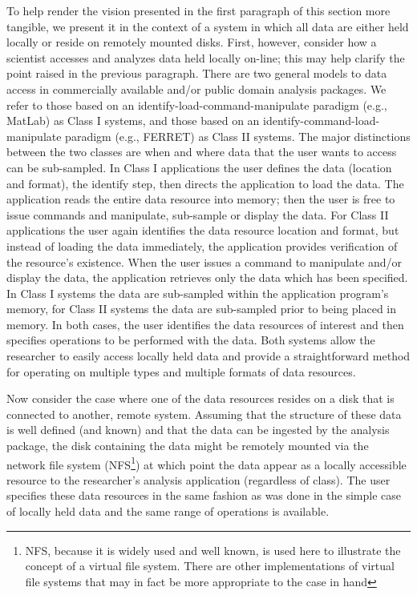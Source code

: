 To help render the vision presented in the first paragraph of this section
more tangible, we present it in the context of a system in which all data are
either held locally or reside on remotely mounted disks.  First, however,
consider how a scientist accesses and analyzes data held locally on-line;
this may help clarify the point raised in the previous paragraph. There are
two general models to data access in commercially available and/or public
domain analysis packages.  We refer to those based on an
identify-load-command-manipulate paradigm (e.g., MatLab) as Class I
systems, and those based on an identify-command-load-manipulate paradigm
(e.g., FERRET) as Class II systems.  The major distinctions between the two
classes are when and where data that the user wants to access can be
sub-sampled.  In Class I applications the user defines the data (location
and format), the identify step, then directs the application to load the
data.  The application reads the entire data resource into memory; then the
user is free to issue commands and manipulate, sub-sample or display the
data.  For Class II applications the user again identifies the data resource
location and format, but instead of loading the data immediately, the
application provides verification of the resource's existence.  When the user
issues a command to manipulate and/or display the data, the application
retrieves only the data which has been specified.  In Class I systems the
data are sub-sampled within the application program's memory, for Class II
systems the data are sub-sampled prior to being placed in memory.  In both
cases, the user identifies the data resources of interest and then specifies
operations to be performed with the data.  Both systems allow the researcher
to easily access locally held data and provide a straightforward method for
operating on multiple types and multiple formats of data resources.

Now consider the case where one of the data resources resides on a disk 
that is connected to another, remote system.  Assuming that the 
structure of these data is well defined (and known) and that the data 
can be ingested by the analysis package, the disk containing the data
might be remotely mounted via the network file system (NFS\footnote{NFS, 
because it is widely used and well known, is used here to
illustrate the concept of a virtual file system.  There are other
implementations of virtual file systems that may in fact be more appropriate
to the case in hand}) at which point the data appear as a locally accessible
resource to the researcher's analysis application (regardless of class).  The
user specifies these data resources in the same fashion as was done in the
simple case of locally held data and the same range of operations is available.

